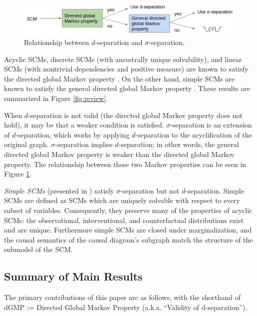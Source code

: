 \documentclass[12pt]{article}
\begin{document}
\begin{figure}
\centering
\includegraphics[width=.8\linewidth]{pics/my_own/inputs_outputs.png}
\caption{Relationship between $d$-separation and $\sigma$-separation.}
\label{fig:inputs-outputs}
\end{figure}

Acyclic SCMs, discrete SCMs (with ancestrally unique solvability), and linear SCMs (with nontrivial dependencies and positive measure) are known to satisfy the directed global Markov property \cite{MarkovCyclesLatent}. On the other hand, simple SCMs are known to satisfy the general directed global Markov property \cite{Foundations}. These results are summarized in Figure \ref{fig:review}.

When $d$-separation is not valid (the directed global Markov property does not hold), it may be that a weaker condition is satisfied. $\sigma$-separation is an extension of $d$-separation, which works by applying $d$-separation to the acyclification of the original graph. $\sigma$-separation implies $d$-separation; in other words, the general directed global Markov property is weaker than the directed global Markov property. The relationship between these two Markov properties can be seen in Figure \ref{fig:inputs-outputs}.

\emph{Simple SCMs} (presented in \cite{Foundations}) satisfy $\sigma$-separation but not $d$-separation. Simple SCMs are defined as SCMs which are uniquely solvable with respect to every subset of variables. Consequently, they preserve many of the properties of acyclic SCMs: the observational, interventional, and counterfactual distributions exist and are unique. Furthermore simple SCMs are closed under marginalization, and the causal semantics of the causal diagram's subgraph match the structure of the submodel of the SCM.

\subsection{Summary of Main Results}

The primary contributions of this paper are as follows, with the shorthand of dGMP := Directed Global Markov Property (a.k.a. “Validity of d-separation”).
\end{document}
